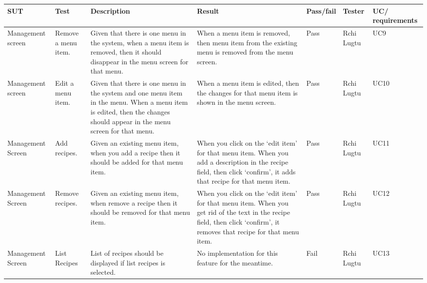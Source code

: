 \begin{tabularx}{\linewidth}{|X|X|X|X|X|X|X|}
\hline
SUT & Test & Description & Result & Pass/fail & Tester & UC/ requirements \\
\hline
Management screen & Remove a menu item. & Given that there is one menu in the system, when a menu item is removed, then it should disappear in the menu screen for that menu. & When a menu item is removed, then menu item from the existing menu is removed from the menu screen. & Pass & Rchi Lugtu & UC9 \\
\hline
Management screen & Edit a menu item. & Given that there is one menu in the system and one menu item in the menu. When a menu item is edited, then the changes should appear in the menu screen for that menu. & When a menu item is edited, then the changes for that menu item is shown in the menu screen. & Pass & Rchi Lugtu & UC10 \\
\hline
Management Screen & Add recipes. & Given an existing menu item, when you add a recipe then it should be added for that menu item. & When you click on the ‘edit item’ for that menu item. When you add a description in the recipe field, then click ‘confirm’, it adds that recipe for that menu item. & Pass & Rchi Lugtu & UC11 \\
\hline
Management Screen & Remove recipes. & Given an existing menu item, when remove a recipe then it should be removed for that menu item. & When you click on the ‘edit item’ for that menu item. When you get rid of the text in the recipe field, then click ‘confirm’, it removes that recipe for that menu item. & Pass & Rchi Lugtu & UC12 \\
\hline
Management Screen & List Recipes & List of recipes should be displayed if list recipes is selected. & No implementation for this feature for the meantime. & Fail & Rchi Lugtu & UC13 \\
\hline
\end{tabularx}
